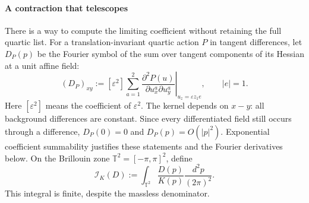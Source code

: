 \documentclass[11pt]{article}
\numberwithin{equation}{section}
\theoremstyle{definition}
\theoremstyle{plain}
\begin{document}
\paragraph{A contraction that telescopes}
There is a way to compute the limiting coefficient without
retaining the full quartic list.  For a translation-invariant
quartic action $P$ in tangent differences, let $D_P(p)$ be the
Fourier symbol of the sum over tangent components of its Hessian
at a unit affine field:
\begin{equation}
 (D_P)_{xy}
 :=[\varepsilon^2]\sum_{a=1}^2
     \left.
     \frac{\partial^2P(u)}{\partial u_x^a\partial u_y^a}
     \right|_{u_z=\varepsilon z_1 e},
 \qquad |e|=1.
 \label{eq:quartic-affine-hessian}
\end{equation}
Here $[\varepsilon^2]$ means the coefficient of $\varepsilon^2$.
The kernel depends on $x-y$: all background differences are
constant.  Since every differentiated field still occurs through
a difference, $D_P(0)=0$ and $D_P(p)=O(|p|^2)$.
Exponential coefficient summability justifies these statements
and the Fourier derivatives below.
On the Brillouin zone $\mathbb T^2=[-\pi,\pi]^2$, define
\begin{equation}
 \mathcal I_K(D):=\int_{\mathbb T^2}\frac{D(p)}{K(p)}
                                    \frac{d^2p}{(2\pi)^2}.
 \label{eq:quartic-massless-contraction}
\end{equation}
This integral is finite, despite the massless denominator.
\end{document}
